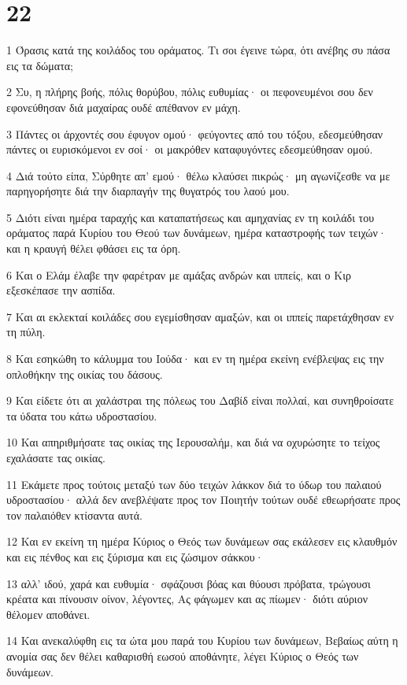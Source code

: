 \chapter{22}

\par 1 Όρασις κατά της κοιλάδος του οράματος. Τι σοι έγεινε τώρα, ότι ανέβης συ πάσα εις τα δώματα;
\par 2 Συ, η πλήρης βοής, πόλις θορύβου, πόλις ευθυμίας· οι πεφονευμένοι σου δεν εφονεύθησαν διά μαχαίρας ουδέ απέθανον εν μάχη.
\par 3 Πάντες οι άρχοντές σου έφυγον ομού· φεύγοντες από του τόξου, εδεσμεύθησαν πάντες οι ευρισκόμενοι εν σοί· οι μακρόθεν καταφυγόντες εδεσμεύθησαν ομού.
\par 4 Διά τούτο είπα, Σύρθητε απ' εμού· θέλω κλαύσει πικρώς· μη αγωνίζεσθε να με παρηγορήσητε διά την διαρπαγήν της θυγατρός του λαού μου.
\par 5 Διότι είναι ημέρα ταραχής και καταπατήσεως και αμηχανίας εν τη κοιλάδι του οράματος παρά Κυρίου του Θεού των δυνάμεων, ημέρα καταστροφής των τειχών· και η κραυγή θέλει φθάσει εις τα όρη.
\par 6 Και ο Ελάμ έλαβε την φαρέτραν με αμάξας ανδρών και ιππείς, και ο Κιρ εξεσκέπασε την ασπίδα.
\par 7 Και αι εκλεκταί κοιλάδες σου εγεμίσθησαν αμαξών, και οι ιππείς παρετάχθησαν εν τη πύλη.
\par 8 Και εσηκώθη το κάλυμμα του Ιούδα· και εν τη ημέρα εκείνη ενέβλεψας εις την οπλοθήκην της οικίας του δάσους.
\par 9 Και είδετε ότι αι χαλάστραι της πόλεως του Δαβίδ είναι πολλαί, και συνηθροίσατε τα ύδατα του κάτω υδροστασίου.
\par 10 Και απηριθμήσατε τας οικίας της Ιερουσαλήμ, και διά να οχυρώσητε το τείχος εχαλάσατε τας οικίας.
\par 11 Εκάμετε προς τούτοις μεταξύ των δύο τειχών λάκκον διά το ύδωρ του παλαιού υδροστασίου· αλλά δεν ανεβλέψατε προς τον Ποιητήν τούτων ουδέ εθεωρήσατε προς τον παλαιόθεν κτίσαντα αυτά.
\par 12 Και εν εκείνη τη ημέρα Κύριος ο Θεός των δυνάμεων σας εκάλεσεν εις κλαυθμόν και εις πένθος και εις ξύρισμα και εις ζώσιμον σάκκου·
\par 13 αλλ' ιδού, χαρά και ευθυμία· σφάζουσι βόας και θύουσι πρόβατα, τρώγουσι κρέατα και πίνουσιν οίνον, λέγοντες, Ας φάγωμεν και ας πίωμεν· διότι αύριον θέλομεν αποθάνει.
\par 14 Και ανεκαλύφθη εις τα ώτα μου παρά του Κυρίου των δυνάμεων, Βεβαίως αύτη η ανομία σας δεν θέλει καθαρισθή εωσού αποθάνητε, λέγει Κύριος ο Θεός των δυνάμεων.
